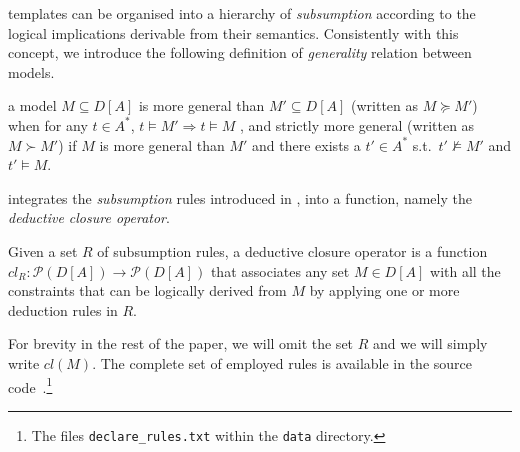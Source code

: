 \declare templates can be organised into a hierarchy of \emph{subsumption} \cite{2017-DiCiccio} according to the logical implications derivable from their semantics. Consistently with this concept, we introduce the following definition of \emph{generality} relation between models.
\begin{definition}{}\label{def:subs}
a model $M\subseteq D[A]$ is more general than $M'\subseteq D[A]$ (written as $M \succeq M'$) when for any $t\in A^*$, $t\models M' \Rightarrow t\models M$ , and strictly more general (written as $M \succ M'$) if $M$ is more general than $M'$ and there exists a $t'\in A^*$ s.t.\ $t'\not\models M'$ and $t'\models M$.
\end{definition}

\nd integrates the \emph{subsumption} rules introduced in \cite{2017-DiCiccio}, into a function, namely the \emph{deductive closure operator}.

\begin{definition}{}
Given a set $R$ of subsumption rules, a deductive closure operator is a function $cl_R: \mathcal{P}(D[A])\rightarrow\mathcal{P}(D[A])$ that associates any set $M \in D[A]$ with all the constraints that can be logically derived from $M$ by applying one or more deduction rules in $R$.
\end{definition}
For brevity in the rest of the paper, we will omit the set $R$ and we will simply write $cl(M)$. The complete set of employed rules is available in the source code~\cite{zenodo:experiments}.\footnote{The files \texttt{declare\_rules.txt} within the \texttt{data} directory.}




